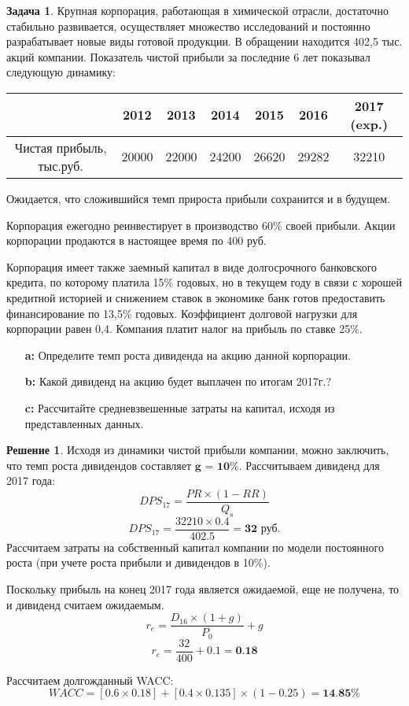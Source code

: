 \documentclass[a4paper, 14pt]{article}
\theoremstyle{plain} %
\theoremstyle{definition} %
\newtheorem*{solution}{Решение}
\newtheorem{problem}{Задача}[subsection]
\theoremstyle{remark} %
\begin{document}
\begin{problem}
	Крупная корпорация, работающая в химической отрасли, достаточно стабильно развивается, осуществляет множество исследований и постоянно разрабатывает новые виды готовой продукции. В обращении находится 402,5 тыс. акций компании. Показатель чистой прибыли за последние 6 лет показывал следующую динамику:
\begin{center}
\begin{tabular}{|c|c|c|c|c|c|c|}
\hline
                         & 2012  & 2013  & 2014  & 2015  & 2016  & 2017 (exp.)  \\
\hline
Чистая прибыль, тыс.руб. & 20000 & 22000 & 24200 & 26620 & 29282 & 32210        \\
\hline
\end{tabular}
\end{center}

	Ожидается, что сложившийся темп прироста прибыли сохранится и в будущем.

	Корпорация ежегодно реинвестирует в производство 60\% своей прибыли. Акции корпорации продаются в настоящее время по 400 руб.

	Корпорация  имеет  также  заемный  капитал  в  виде  долгосрочного  банковского кредита, по которому платила 15\% годовых, но в текущем году в связи с хорошей кредитной историей и снижением ставок в экономике банк готов предоставить финансирование по  13,5\% годовых. Коэффициент долговой нагрузки для корпорации равен 0,4. Компания платит налог на прибыль по ставке 25\%.
	\begin{itemize}
		\item[\textbf{a:}] Определите темп роста дивиденда на акцию данной корпорации.
		\item[\textbf{b:}] Какой дивиденд на акцию будет выплачен по итогам 2017г.?
		\item[\textbf{c:}] Рассчитайте  средневзвешенные  затраты  на  капитал,  исходя  из  представленных данных.
	\end{itemize}

	\newpage

	\begin{solution}
		Исходя из динамики чистой прибыли компании, можно заключить, что темп роста дивидендов составляет $\textbf{g = 10\%}$.
		Рассчитываем дивиденд для 2017 года:
		\[DPS_{17} = \frac{PR \times (1-RR)}{Q_{s}}\]
		\[DPS_{17} = \frac{32210 \times 0.4}{402.5} = \textbf{32 руб.}\]
		Рассчитаем затраты на собственный капитал компании по модели постоянного роста (при учете роста прибыли и дивидендов в 10\%).

		Поскольку прибыль на конец 2017 года является ожидаемой, еще не получена, то и дивиденд считаем ожидаемым.
		\[r_{e} = \frac{D_{16}\times(1+g)}{P_{0}} + g\]
		\[r_{e} = \frac{32}{400} + 0.1 = \textbf{0.18}\]

		Рассчитаем долгожданный WACC:
		\[WACC = [0.6 \times 0.18] + [0.4 \times 0.135] \times (1-0.25) = \textbf{14.85\%}\]
	\end{solution}
\end{problem}
\end{document}
